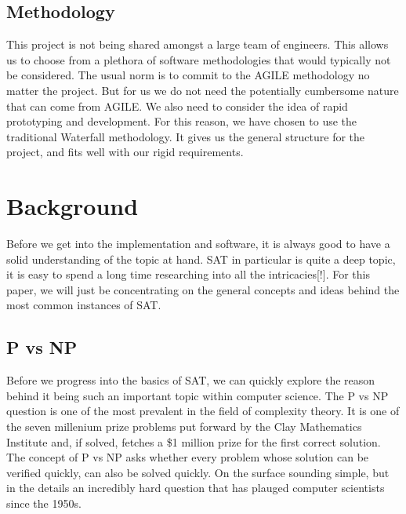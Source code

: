 \documentclass{article}
\begin{document}

\subsection{Methodology}
This project is not being shared amongst a large team of engineers. This allows us to choose from a plethora of software methodologies that would typically not be considered. The usual norm is to commit to the AGILE methodology no matter the project. But for us we do not need the potentially cumbersome nature that can come from AGILE. We also need to consider the idea of rapid prototyping and development. For this reason, we have chosen to use the traditional Waterfall methodology. It gives us the general structure for the project, and fits well with our rigid requirements.

\section{Background}
Before we get into the implementation and software, it is always good to have a solid understanding
of the topic at hand. SAT in particular is quite a deep topic, it is easy to spend a long time
researching into all the intricacies[!]. For this paper, we will just be concentrating on the
general concepts and ideas behind the most common instances of SAT.

\subsection{P vs NP}
Before we progress into the basics of SAT, we can quickly explore the reason behind it being such an
important topic within computer science. The P vs NP question is one of the most prevalent in the
field of complexity theory. It is one of the seven millenium prize problems put forward by the Clay
Mathematics Institute and, if solved, fetches a \$1 million prize for the first correct solution.
The concept of P vs NP asks whether every problem whose solution can be verified quickly, can also
be solved quickly. On the surface sounding simple, but in the details an incredibly hard question
that has plauged computer scientists since the 1950s.
\end{document}
